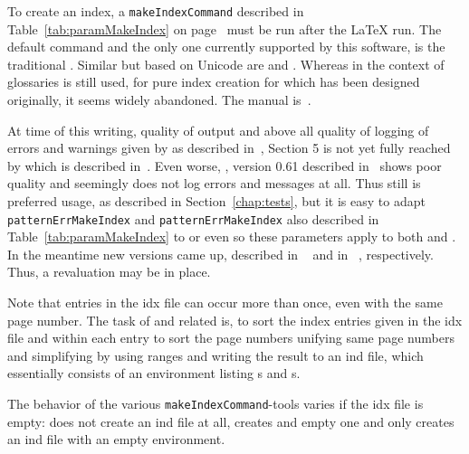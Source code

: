 To create an index, 
a \texttt{makeIndexCommand} described in Table~\ref{tab:paramMakeIndex} on page~\pageref{tab:paramMakeIndex} 
must be run after the \LaTeX{} run. 
The default command and the only one currently supported by this software, 
is the traditional . 
Similar but based on Unicode are  and . 
Whereas in the context of glossaries  is still used, 
for pure index creation for which  has been designed originally, 
it seems widely abandoned. 
The manual is~\cite{XindyMan}. 

At time of this writing, quality of output and above all quality of logging of errors and warnings 
given by  as described in~\cite{MkIdxMoe}, Section 5 
is not yet fully reached by  which is described in~\cite{UpMendex109}. 
Even worse, , version 0.61 described in~\cite{Xindex061}
shows poor quality and seemingly does not log errors and messages at all. 
Thus still  is preferred usage, as described in Section~\ref{chap:tests}, 
but it is easy to adapt \texttt{patternErrMakeIndex} and \texttt{patternErrMakeIndex} 
also described in Table~\ref{tab:paramMakeIndex} to  
or even so these parameters apply to both  and . 
In the meantime new versions came up, described in ~\cite{UpMendex111} and in ~\cite{Xindex102}, 
respectively. 
Thus, a revaluation may be in place. 



Note that entries in the \gls{idx} file can occur more than once, 
even with the same page number. 
The task of  and related is, 
to sort the index entries given in the \gls{idx} file 
and within each entry to sort the page numbers 
unifying same page numbers and simplifying by using ranges 
and writing the result to an \gls{ind} file, 
which essentially consists of an  environment 
listing s and s. 


The behavior of the various \texttt{makeIndexCommand}-tools varies 
if the \gls{idx} file is empty:  does not create an \gls{ind} file at all, 
 creates and empty one and only  
creates an \gls{ind} file with an empty  environment. 






